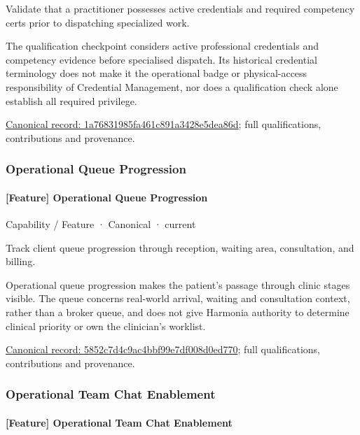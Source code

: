 Validate that a practitioner possesses active credentials and required competency certs prior to dispatching specialized work.



The qualification checkpoint considers active professional credentials and competency evidence before specialised dispatch. Its historical credential terminology does not make it the operational badge or physical-access responsibility of Credential Management, nor does a qualification check alone establish all required privilege.


{\footnotesize \href{../../../../continuum/strategy/capability/feature/1a76831985fa461c891a3428e5dea86d.md}{Canonical record: 1a76831985fa461c891a3428e5dea86d}; full qualifications, contributions and provenance.}\par
\subsubsection{Operational Queue Progression}

\paragraph{[Feature] Operational Queue Progression}

\label{element:5852c7d4c9ac4bbf99e7df008d0ed770}
{\small Capability / Feature · Canonical · current}\par

Track client queue progression through reception, waiting area, consultation, and billing.



Operational queue progression makes the patient's passage through clinic stages visible. The queue concerns real-world arrival, waiting and consultation context, rather than a broker queue, and does not give Harmonia authority to determine clinical priority or own the clinician's worklist.


{\footnotesize \href{../../../../continuum/strategy/capability/feature/5852c7d4c9ac4bbf99e7df008d0ed770.md}{Canonical record: 5852c7d4c9ac4bbf99e7df008d0ed770}; full qualifications, contributions and provenance.}\par
\subsubsection{Operational Team Chat Enablement}

\paragraph{[Feature] Operational Team Chat Enablement}

